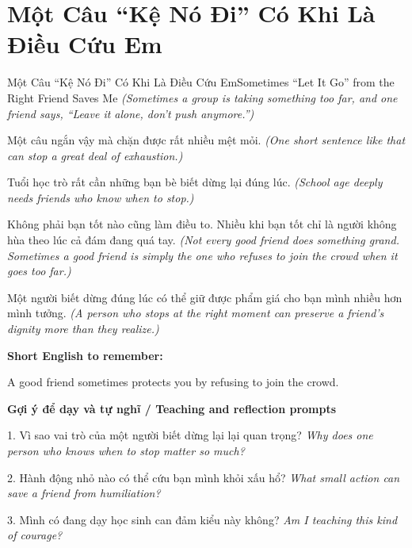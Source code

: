\section{Một Câu “Kệ Nó Đi” Có Khi Là Điều Cứu Em}
\begin{truyen}{Một Câu “Kệ Nó Đi” Có Khi Là Điều Cứu Em}{Sometimes “Let It Go” from the Right Friend Saves Me}
\textit{(Sometimes a group is taking something too far, and one friend says, “Leave it alone, don't push anymore.”)}

Một câu ngắn vậy mà chặn được rất nhiều mệt mỏi.
\textit{(One short sentence like that can stop a great deal of exhaustion.)}

Tuổi học trò rất cần những bạn bè biết dừng lại đúng lúc.
\textit{(School age deeply needs friends who know when to stop.)}

Không phải bạn tốt nào cũng làm điều to. Nhiều khi bạn tốt chỉ là người không hùa theo lúc cả đám đang quá tay.
\textit{(Not every good friend does something grand. Sometimes a good friend is simply the one who refuses to join the crowd when it goes too far.)}

\end{truyen}

\begin{baihoc}
Một người biết dừng đúng lúc có thể giữ được phẩm giá cho bạn mình nhiều hơn mình tưởng.
\textit{(A person who stops at the right moment can preserve a friend's dignity more than they realize.)}
\end{baihoc}

\begin{ghinhoanh}
\textbf{Short English to remember:}

A good friend sometimes protects you by refusing to join the crowd.

\end{ghinhoanh}

\begin{tuhocnhanh}
\textbf{Gợi ý để dạy và tự nghĩ / Teaching and reflection prompts}

1. Vì sao vai trò của một người biết dừng lại lại quan trọng? \textit{Why does one person who knows when to stop matter so much?}

2. Hành động nhỏ nào có thể cứu bạn mình khỏi xấu hổ? \textit{What small action can save a friend from humiliation?}

3. Mình có đang dạy học sinh can đảm kiểu này không? \textit{Am I teaching this kind of courage?}
\end{tuhocnhanh}
